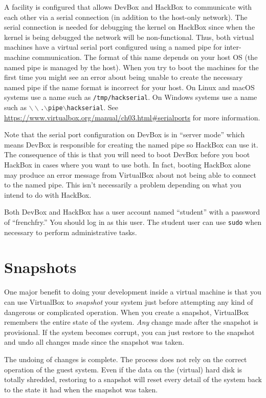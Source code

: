 \documentclass{article}
\newcommand{\filename}[1]{\texttt{#1}}
\begin{document}
A facility is configured that allows DevBox and HackBox to communicate with each other via a
serial connection (in addition to the host-only network). The serial connection is needed for
debugging the kernel on HackBox since when the kernel is being debugged the network will be
non-functional. Thus, both virtual machines have a virtual serial port configured using a named
pipe for inter-machine communication. The format of this name depends on your host OS (the named
pipe is managed by the host). When you try to boot the machines for the first time you might see
an error about being unable to create the necessary named pipe if the name format is incorrect
for your host. On Linux and macOS systems use a name such as \filename{/tmp/hackserial}. On
Windows systems use a name such as
\filename{$\backslash\backslash$.$\backslash$pipe$\backslash$hackserial}. See
\url{https://www.virtualbox.org/manual/ch03.html#serialports} for more information.

Note that the serial port configuration on DevBox is in ``server mode'' which means DevBox is
responsible for creating the named pipe so HackBox can use it. The consequence of this is that
you will need to boot DevBox before you boot HackBox in cases where you want to use both. In
fact, booting HackBox alone may produce an error message from VirtualBox about not being able to
connect to the named pipe. This isn't necessarily a problem depending on what you intend to do
with HackBox.

Both DevBox and HackBox has a user account named ``student'' with a password of ``frenchfry.''
You should log in as this user. The student user can use \texttt{sudo} when necessary to perform
administrative tasks.

\section{Snapshots}
\label{sec:snapsots}

One major benefit to doing your development inside a virtual machine is that you can use
VirtualBox to \emph{snapshot} your system just before attempting any kind of dangerous or
complicated operation. When you create a snapshot, VirtualBox remembers the entire state of the
system. \emph{Any} change made after the snapshot is provisional. If the system becomes corrupt,
you can just restore to the snapshot and undo all changes made since the snapshot was taken.

The undoing of changes is complete. The process does not rely on the correct operation of the
guest system. Even if the data on the (virtual) hard disk is totally shredded, restoring to a
snapshot will reset every detail of the system back to the state it had when the snapshot was
taken.
\end{document}
